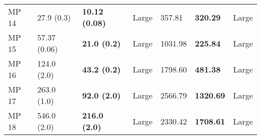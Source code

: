 \begin{tabular}{lllllll}
MP 14 &        27.9 (0.3) & \textbf{10.12 (0.08)} &       Large &                  357.81 &          \textbf{320.29} &       Large \\
MP 15 &      57.37 (0.06) &   \textbf{21.0 (0.2)} &       Large &                 1031.98 &          \textbf{225.84} &       Large \\
MP 16 &       124.0 (2.0) &   \textbf{43.2 (0.2)} &       Large &                 1798.60 &          \textbf{481.38} &       Large \\
MP 17 &       263.0 (1.0) &   \textbf{92.0 (2.0)} &       Large &                 2566.79 &         \textbf{1320.69} &       Large \\
MP 18 &       546.0 (2.0) &  \textbf{216.0 (2.0)} &       Large &                 2330.42 &         \textbf{1708.61} &       Large \\
\bottomrule
\end{tabular}
